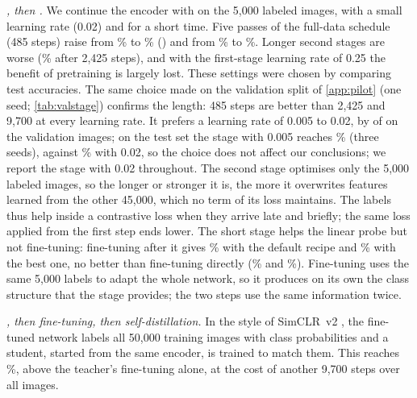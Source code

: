 \emph{\simclr, then \supcon.} We continue the \simclr encoder with \supcon on the 5,000 labeled images, with
a small learning rate (0.02) and for a short time. Five passes of the full-data schedule (485 steps) raise
\lpfive from \% to \%
() and \lpall from \% to
\%. Longer second stages are worse (\%
\lpfive after 2,425 steps), and with the first-stage learning rate of 0.25 the benefit of pretraining is
largely lost. These settings were chosen by comparing test accuracies. The same choice made on the validation
split of \ref{app:pilot} (one seed; \cref{tab:valstage}) confirms the length: 485 steps are better than
2,425 and 9,700 at every learning rate. It prefers a learning rate of 0.005 to 0.02, by
\pt of \lpfive on the validation images; on the test set the stage with 0.005 reaches
\% \lpfive (three seeds), against
\% with 0.02, so the choice does not affect our conclusions; we report the
stage with 0.02 throughout. The second stage optimises only the 5,000 labeled images, so the longer or
stronger it is, the more it overwrites features learned from the other 45,000, which no term of its loss
maintains. The
labels thus help inside a contrastive loss when they arrive late and briefly; the same
loss applied from the first step ends \pt lower. The short stage helps the linear
probe but not fine-tuning: fine-tuning after it gives \% with the default
recipe and \% with the best one, no better than fine-tuning \simclr
directly (\% and \%). Fine-tuning uses the same 5,000
labels to adapt the whole network, so it produces on its own the class structure that the \supcon stage
provides; the two steps use the same information twice.

\emph{\simclr, then fine-tuning, then self-distillation.} In the style of SimCLR~v2 \citep{chen2020simclrv2},
the fine-tuned network labels all 50,000 training images with class probabilities and a student, started
from the same \simclr encoder, is trained to match them. This reaches \%,
\pt above the teacher's fine-tuning alone, at the cost of another 9,700 steps over all
images.

